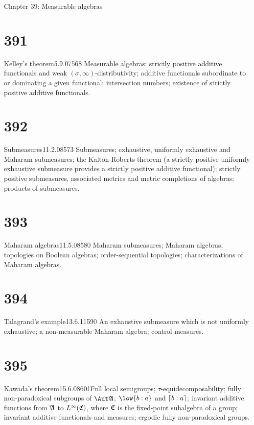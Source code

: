      
 Chapter 39:  Measurable algebras
     
     
\section{391}{Kelley's theorem}{5.9.07}{568}{}
{Measurable algebras;  strictly positive additive functionals and
weak $(\sigma,\infty)$-distributivity;  additive functionals
subordinate to or dominating
a given functional;  intersection numbers;   existence of strictly
positive additive functionals.}
     
\section{392}{Submeasures}{11.2.08}{573}{}
{Submeasures;  exhaustive, uniformly exhaustive and Maharam
submeasures;  the Kalton-Roberts
theorem (a strictly positive uniformly exhaustive submeasure
provides a strictly positive additive functional);  strictly positive
submeasures, associated metrics and metric completions of algebras;
products of submeasures.}
     
\section{393}{Maharam algebras}{11.5.08}{580}{}
{Maharam submeasures;  Maharam algebras;  topologies on Boolean algebras;
order-sequential topologies;  characterizations of Maharam algebras.}

\section{394}{Talagrand's example}{13.6.11}{590}{}
{An exhaustive submeasure which is not uniformly exhaustive;  a 
non-measurable Maharam algebra;  control measures.}
     
\section{395}{Kawada's theorem}{15.6.08}{601}{}{Full local semigroups;
$\tau$-equidecomposability;  fully
non-paradoxical subgroups of $\Aut\frak{A}$;  \hbox{$\low{b:a}$} and
$\lceil b:a\rceil$;  invariant additive functions from $\frak{A}$ to
$L^{\infty}(\frak{C})$, where $\frak{C}$ is the fixed-point subalgebra of 
a group;  invariant additive functionals and measures;  ergodic fully
non-paradoxical groups.}
     
